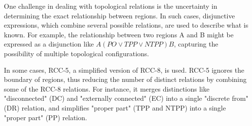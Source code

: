 One challenge in dealing with topological relations is the uncertainty in determining the exact relationship between regions. In such cases, disjunctive expressions, which combine several possible relations, are used to describe what is known. For example, the relationship between two regions A and B might be expressed as a disjunction like $A \left( PO \lor TPP \lor NTPP \right) B$, capturing the possibility of multiple topological configurations.

In some cases, RCC-5, a simplified version of RCC-8, is used. RCC-5 ignores the boundary of regions, thus reducing the number of distinct relations by combining some of the RCC-8 relations. For instance, it merges distinctions like "disconnected" (DC) and "externally connected" (EC) into a single "discrete from" (DR) relation, and simplifies "proper part" (TPP and NTPP) into a single "proper part" (PP) relation.





